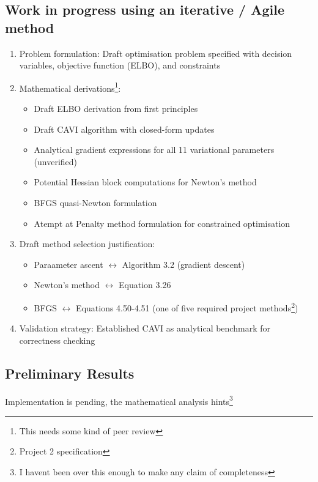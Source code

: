 \documentclass[11pt]{article}
\begin{document}
\subsection*{Work in progress using an iterative / Agile method}

\begin{enumerate}
\item Problem formulation: Draft optimisation problem specified with decision variables, objective function (ELBO), and constraints

\item Mathematical derivations\footnote{This needs some kind of peer review}:   
\begin{itemize}
\item Draft ELBO derivation from first principles
\item Draft CAVI algorithm with closed-form updates
\item Analytical gradient expressions for all 11 variational parameters (unverified) 
\item Potential Hessian block computations for Newton's method
\item BFGS quasi-Newton formulation
\item Atempt at Penalty method formulation for constrained optimisation
\end{itemize}

\item Draft method selection justification:  
\begin{itemize}
\item Paraameter ascent $\leftrightarrow$ Algorithm 3.2 (gradient descent)
\item Newton's method $\leftrightarrow$ Equation 3.26
\item BFGS $\leftrightarrow$ Equations 4.50-4.51 (one of five required project methods\footnote{Project 2 specification})
\end{itemize}

\item Validation strategy: Established CAVI as analytical benchmark for correctness checking
\end{enumerate}

\subsection*{Preliminary Results}

Implementation is pending, the mathematical analysis hints\footnote{I havent been over this enough to make any claim of completeness}
\end{document}
